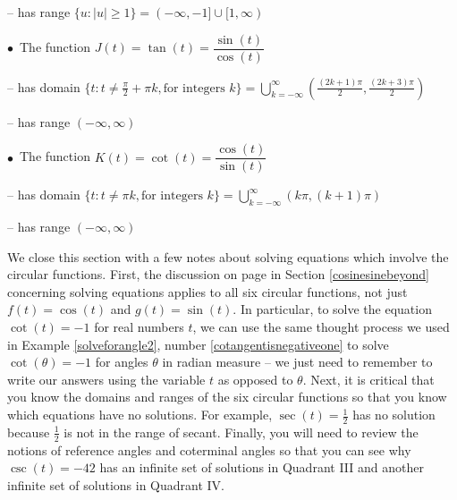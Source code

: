 \begin{minipage}{\specialboxlength}
{\hspace{.5in} -- has range $\{ u : |u| \geq 1 \} =  (-\infty, -1] \cup [1, \infty) $ 

\medskip

\hspace{.3in} $\bullet \, $ The function $J(t) = \tan(t) = \dfrac{\sin(t)}{\cos(t)}$

\hspace{.5in} -- has domain $\{ t : t \neq  \frac{\pi}{2} + \pi k, \text{for integers $k$} \}  = \displaystyle{\bigcup_{k = -\infty}^{\infty} \left( \frac{(2k+1)\pi}{2}, \frac{(2k+3) \pi}{2} \right)}$ 

\hspace{.5in} -- has range $(-\infty, \infty)$ 

\medskip

\hspace{.3in} $\bullet \, $ The function $K(t) = \cot(t) = \dfrac{\cos(t)}{\sin(t)}$

\hspace{.5in} -- has domain $\{ t : t \neq \pi k, \text{for integers $k$} \}  = \displaystyle{\bigcup_{k = -\infty}^{\infty} \left(k \pi ,(k+1) \pi \right)}$ 

\hspace{.5in} -- has range $(-\infty, \infty)$ 
}
\end{minipage}
\restoreboxwidth

\medskip

We close this section with a few notes about solving equations which involve the circular functions.  First, the discussion on page \pageref{cosinesineequationsrealnumbers} in Section \ref{cosinesinebeyond} concerning solving equations applies to all six circular functions, not just $f(t) = \cos(t)$ and $g(t) = \sin(t)$. In particular, to solve the equation $\cot(t) = -1$ for real numbers $t$, we can use the same thought process we used in Example \ref{solveforangle2}, number \ref{cotangentisnegativeone} to solve $\cot(\theta) = -1$ for angles $\theta$ in radian measure --  we just need to remember to write our answers using the variable $t$ as opposed to $\theta$. Next, it is critical that you know the domains and ranges of the six circular functions so that you know which equations have no solutions.  For example, $\sec(t) = \frac{1}{2}$ has no solution because $\frac{1}{2}$ is not in the range of secant. Finally, you will need to review the notions of reference angles and coterminal angles so that you can see why $\csc(t) = -42$ has an infinite set of solutions in Quadrant III and another infinite set of solutions in Quadrant IV.




